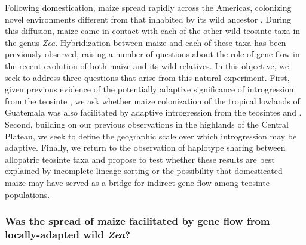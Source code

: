 Following domestication, maize spread rapidly across the Americas, colonizing novel environments different from that inhabited by its wild ancestor \zp. 
During this diffusion, maize came in contact with each of the other wild teosinte taxa in the genus \emph{Zea}.  
Hybridization between maize and each of these taxa has been previously observed, raising a number of questions about the role of gene flow in the recent evolution of both maize and its wild relatives.
In this objective, we seek to address three questions that arise from this natural experiment.  
First, given previous evidence of the potentially adaptive significance of introgression from the teosinte \zm, we ask whether maize colonization of the tropical lowlands of Guatemala was also facilitated by adaptive introgression from the teosintes \zl{} and \zh.
Second, building on our previous observations in the highlands of the Central Plateau, we seek to define the geographic scale over which introgression may be adaptive.
Finally, we return to the observation of haplotype sharing between allopatric teosinte taxa \citep{Ross-Ibarra2009a} and propose to test whether these results are best explained by incomplete lineage sorting or the possibility that domesticated maize may have served as a bridge for indirect gene flow among teosinte populations. 

\subsubsection{Was the spread of maize facilitated by gene flow from locally-adapted wild \emph{Zea}?}
\label{sss:adaptive_intro}

